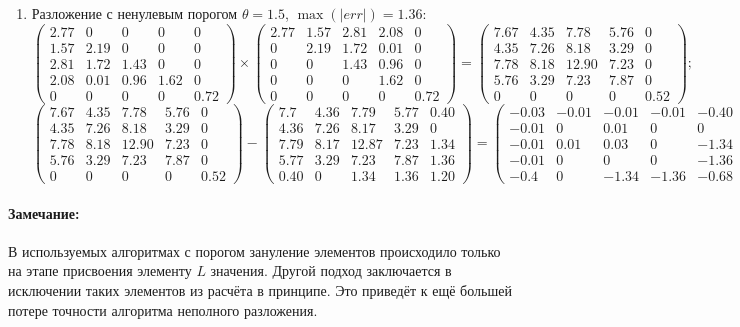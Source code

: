 \begin{enumerate}
    \item Разложение с ненулевым порогом $\theta=1.5$, $\max(|err|) = 1.36$:
    $$\begin{pmatrix}
        2.77&  0   & 0   & 0   & 0\\
        1.57&  2.19& 0   & 0   & 0\\
        2.81&  1.72& 1.43& 0   & 0\\
        2.08&  0.01& 0.96& 1.62& 0\\
        0   &  0   & 0   & 0   & 0.72
    \end{pmatrix} \times
    \begin{pmatrix}
        2.77&  1.57&  2.81&  2.08&   0\\
        0   &  2.19&  1.72&  0.01&   0   \\
        0   &  0   &  1.43&  0.96&   0\\
        0   &  0   &  0   &  1.62&   0\\
        0   &  0   &  0   &  0   &   0.72
    \end{pmatrix} =
    \begin{pmatrix}
        7.67&  4.35&   7.78&  5.76&  0\\
        4.35&  7.26&   8.18&  3.29&  0\\
        7.78&  8.18&  12.90&  7.23&  0\\
        5.76&  3.29&   7.23&  7.87&  0\\
        0   &  0   &   0   &  0   &  0.52
    \end{pmatrix};$$
    $$\begin{pmatrix}
        7.67&  4.35&   7.78&  5.76&  0\\
        4.35&  7.26&   8.18&  3.29&  0\\
        7.78&  8.18&  12.90&  7.23&  0\\
        5.76&  3.29&   7.23&  7.87&  0\\
        0   &  0   &   0   &  0   &  0.52
    \end{pmatrix} -
    \begin{pmatrix}
        7.7  & 4.36 & 7.79  & 5.77 & 0.40 \\
        4.36 & 7.26 & 8.17  & 3.29 & 0    \\
        7.79 & 8.17 & 12.87 & 7.23 & 1.34 \\
        5.77 & 3.29 & 7.23  & 7.87 & 1.36 \\
        0.40 & 0    & 1.34  & 1.36 & 1.20
    \end{pmatrix} =
    \begin{pmatrix}
        -0.03& -0.01& -0.01& -0.01& -0.40\\
        -0.01&  0   &  0.01&  0   &  0\\
        -0.01&  0.01&  0.03&  0   & -1.34\\
        -0.01&    0 &    0 &  0   & -1.36\\
        -0.4 &    0 & -1.34& -1.36& -0.68
    \end{pmatrix};$$
\end{enumerate}

\paragraph{Замечание:} В используемых алгоритмах с порогом зануление элементов происходило только на этапе присвоения элементу $L$ значения. Другой подход заключается в исключении таких элементов из расчёта в принципе. Это приведёт к ещё большей потере точности алгоритма неполного разложения.
